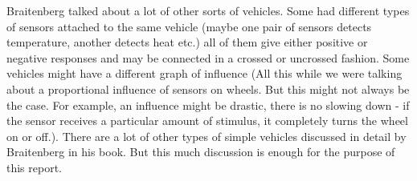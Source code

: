     Braitenberg talked about a lot of other sorts of vehicles. Some had different types of sensors attached to the same vehicle (maybe one pair of sensors detects temperature, another detects heat etc.) all of them give either positive or negative responses and may be connected in a crossed or uncrossed fashion. Some vehicles might have a different graph of influence (All this while we were talking about a proportional influence of sensors on wheels. But this might not always be the case. For example, an influence might be drastic, there is no slowing down - if the sensor receives a particular amount of stimulus, it completely turns the wheel on or off.). There are a lot of other types of simple vehicles discussed in detail by Braitenberg in his book. But this much discussion is enough for the purpose of this report.
